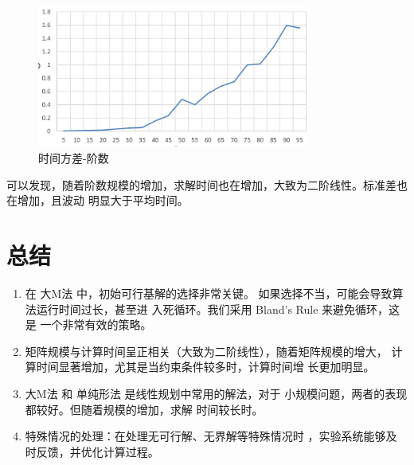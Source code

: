 \documentclass[10pt,a4paper,oneside]{article}
\begin{document}
\begin{figure}[H]
    \centering
    \includegraphics[width=0.8\textwidth]{屏幕截图 2024-12-03 112655.png}
	\caption{时间方差-阶数}
\end{figure}

可以发现，随着阶数规模的增加，求解时间也在增加，大致为二阶线性。标准差也在增加，且波动
明显大于平均时间。


\section{总结}

\begin{enumerate}
    \item 在 大M法 中，初始可行基解的选择非常关键。
    如果选择不当，可能会导致算法运行时间过长，甚至进
    入死循环。我们采用 Bland’s Rule 来避免循环，这是
    一个非常有效的策略。
    \item 矩阵规模与计算时间呈正相关（大致为二阶线性），随着矩阵规模的增大，
    计算时间显著增加，尤其是当约束条件较多时，计算时间增
    长更加明显。
    \item 大M法 和 单纯形法 是线性规划中常用的解法，对于
    小规模问题，两者的表现都较好。但随着规模的增加，求解
    时间较长时。
    \item 
    特殊情况的处理：在处理无可行解、无界解等特殊情况时
    ，实验系统能够及时反馈，并优化计算过程。
\end{enumerate}
\end{document}
